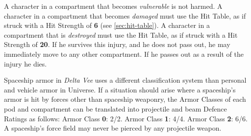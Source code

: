 A character in a compartment that becomes \emph{vulnerable} is not
harmed. A character in a compartment that becomes \emph{damaged} must
use the Hit Table, as if struck with a Hit Strength of \textbf{6} (see
\ref{sec:hit-table}). A character in a compartment that is
\emph{destroyed} must use the Hit Table, as if struck with a Hit
Strength of \textbf{20}. If he survives this injury, and he does not
pass out, he may immediately move to any other compartment. If he
passes out as a result of the injury he dies.

Spaceship armor in \emph{Delta Vee} uses a different classification
system than personal and vehicle armor in Universe. If a situation
should arise where a spaceship's armor is hit by forces other than
spaceship weaponry, the Armor Classes of each pod and compartment can
be translated into projectile and beam Defence Ratings as follows:
Armor Class \textbf{0}: 2/2. Armor Class \textbf{1}: 4/4.  Armor Class
\textbf{2}: 6/6. A spaceship's force field may never be pierced by any
projectile weapon.


  
